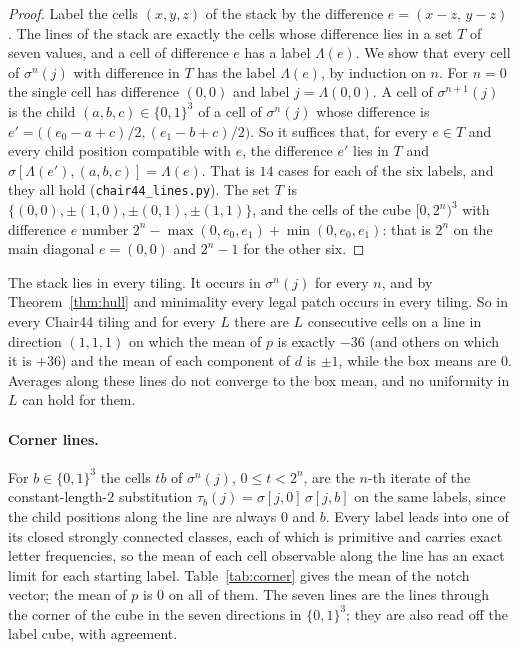 \documentclass[11pt]{article}
\theoremstyle{definition}
\theoremstyle{remark}
\newcommand{\code}[1]{\texttt{#1}}
\begin{document}
\begin{proof}
Label the cells $(x,y,z)$ of the stack by the difference $e=(x-z,\,y-z)$.  The lines of the stack are exactly the cells whose
difference lies in a set $T$ of seven values, and a cell of difference $e$ has a label $\Lambda(e)$.  We show that every cell of
$\sigma^{n}(j)$ with difference in $T$ has the label $\Lambda(e)$, by induction on $n$.  For $n=0$ the single cell has difference
$(0,0)$ and label $j=\Lambda(0,0)$.  A cell of $\sigma^{n+1}(j)$ is the child $(a,b,c)\in\{0,1\}^{3}$ of a cell of
$\sigma^{n}(j)$ whose difference is $e'=\bigl((e_{0}-a+c)/2,(e_{1}-b+c)/2\bigr)$.  So it suffices that, for every $e\in T$ and
every child position compatible with $e$, the difference $e'$ lies in $T$ and $\sigma[\Lambda(e'),(a,b,c)]=\Lambda(e)$.  That
is $14$ cases for each of the six labels, and they all hold (\code{chair44\_lines.py}).  The set $T$ is $\{(0,0),\pm(1,0),\pm(0,1),\pm(1,1)\}$, and the cells of the cube $[0,2^{n})^{3}$ with difference $e$ number
$2^{n}-\max(0,e_{0},e_{1})+\min(0,e_{0},e_{1})$: that is $2^{n}$ on the main diagonal $e=(0,0)$ and $2^{n}-1$ for the other six.
\end{proof}

\noindent
The stack lies in every tiling.  It occurs in $\sigma^{n}(j)$ for every $n$, and by Theorem~\ref{thm:hull} and minimality every
legal patch occurs in every tiling.  So in every Chair44 tiling and for every $L$ there are $L$ consecutive cells on a line
in direction $(1,1,1)$ on which the mean of $p$ is exactly $-36$ (and others on which it is $+36$) and the mean of each
component of $d$ is $\pm1$, while the box means are $0$.  Averages along these lines do not converge to the box mean, and
no uniformity in $L$ can hold for them.

\paragraph{Corner lines.}  For $b\in\{0,1\}^{3}$ the cells $tb$ of $\sigma^{n}(j)$, $0\le t<2^{n}$, are the $n$-th iterate of the
constant-length-$2$ substitution $\tau_{b}(j)=\sigma[j,0]\,\sigma[j,b]$ on the same labels, since the child positions along
the line are always $0$ and $b$.  Every label leads into one of its closed strongly connected classes, each of which is
primitive and carries exact letter frequencies, so the mean of each cell observable along the line has an exact limit for each
starting label.  Table~\ref{tab:corner} gives the
mean of the notch vector; the mean of $p$ is $0$ on all of them.  The seven lines are the lines through the corner of the
cube in the seven directions in $\{0,1\}^{3}$; they are also read off the label cube, with agreement.
\end{document}
